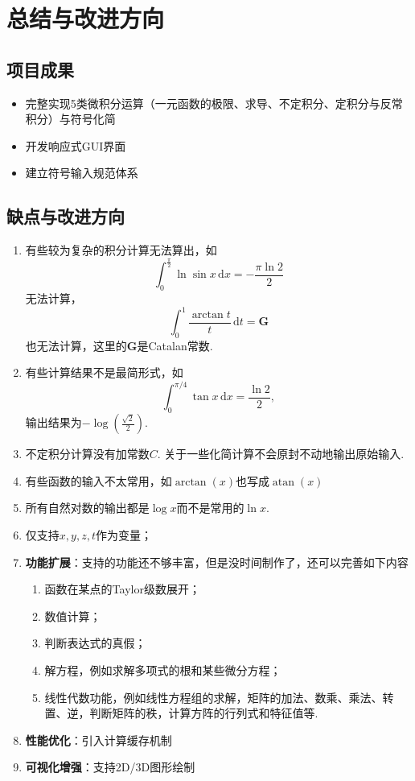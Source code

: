 \documentclass[UTF8,12pt]{ctexart}
\begin{document}
	\section{总结与改进方向}
	\subsection{项目成果}
	\begin{itemize}
		\item 完整实现5类微积分运算（一元函数的极限、求导、不定积分、定积分与反常积分）与符号化简
		\item 开发响应式GUI界面
		\item 建立符号输入规范体系
	\end{itemize}
	
	\subsection{缺点与改进方向}
	\begin{enumerate}
		\item 有些较为复杂的积分计算无法算出，如\[\int_0^{\frac{\pi}2}\ln\sin x\,\mathrm dx=-\frac{\pi\ln 2}2\]无法计算，\[\int_0^1\frac{\arctan t}{t}\,\mathrm dt=\boldsymbol{G}\]也无法计算，这里的$\boldsymbol{G}$是Catalan常数. 
		\item 有些计算结果不是最简形式，如\[\int_0^{\pi/4}\tan x\,\mathrm dx=\frac{\ln 2}2,\]输出结果为$-\log\left(\frac{\sqrt2}2\right).$
		\item 不定积分计算没有加常数$C$.  关于一些化简计算不会原封不动地输出原始输入. 
		\item 有些函数的输入不太常用，如$\arctan(x)$也写成$\operatorname{atan}(x)$
		\item 所有自然对数的输出都是$\log x$而不是常用的$\ln x$.
		\item 仅支持$x,y,z,t$作为变量； 
		\item \textbf{功能扩展}：支持的功能还不够丰富，但是没时间制作了，还可以完善如下内容\begin{enumerate}
			\item 函数在某点的Taylor级数展开；
			\item 数值计算；
			\item 判断表达式的真假；
			\item 解方程，例如求解多项式的根和某些微分方程；
			\item 线性代数功能，例如线性方程组的求解，矩阵的加法、数乘、乘法、转置、逆，判断矩阵的秩，计算方阵的行列式和特征值等. 
		\end{enumerate}
		\item \textbf{性能优化}：引入计算缓存机制
		\item \textbf{可视化增强}：支持2D/3D图形绘制
	\end{enumerate}
	
\end{document}
